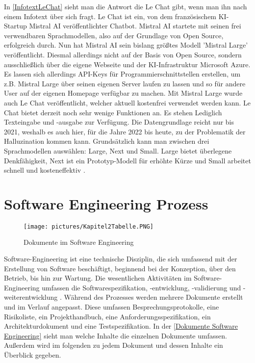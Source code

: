 In \autoref{InfotextLeChat} sieht man die Antwort die Le Chat gibt, wenn man ihn nach einem Infotext über sich 
fragt. Le Chat ist ein, von dem französischem KI-Startup Mistral AI veröffentlichter Chatbot. Mistral AI startete mit  
seinen frei verwendbaren Sprachmodellen, also auf der Grundlage von Open Source, erfolgreich durch. Nun  
hat Mistral AI sein bislang größtes Modell 'Mistral Large' veröffentlicht. Diesmal allerdings nicht auf der  
Basis von Open Source, sondern ausschließlich über die eigene Webseite und der KI-Infrastruktur Microsoft  
Azure. Es lassen sich allerdings API-Keys für Programmierschnittstellen erstellen, um z.B. Mistral Large über  
seinen eigenen Server laufen zu lassen und so für andere User auf der eigenen Homepage verfügbar zu machen.  
Mit Mistral Large wurde auch Le Chat veröffentlicht, welcher aktuell kostenfrei verwendet werden kann.
Le Chat bietet derzeit noch sehr wenige Funktionen an. Es stehen Lediglich Texteingabe und -ausgabe zur Verfügung.  
Die Datengrundlage reicht nur bis 2021, weshalb es auch hier, für die Jahre 2022 bis heute, zu der Problematik der  
Halluzination kommen kann.
Grundsätzlich kann man zwischen drei Sprachmodellen auswählen: Large, Next und Small. Large bietet überlegene Denkfähigkeit,  
Next ist ein Prototyp-Modell für erhöhte Kürze und Small arbeitet schnell und kosteneffektiv \cite{GrundlagenLeChat}.


\section{Software Engineering Prozess}

\begin{figure}
    \centering
    \texttt{[image: pictures/Kapitel2Tabelle.PNG]}
    \caption{Dokumente im Software Engineering}
    \label{Dokumente Software Engineering}
\end{figure}

Software-Engineering ist eine technische Disziplin, die sich umfassend mit der Erstellung von Software beschäftigt, 
beginnend bei der Konzeption, über den Betrieb, bis hin zur Wartung. Die wesentlichen Aktivitäten im Software-Engineering 
umfassen die Softwarespezifikation, -entwicklung, -validierung und -weiterentwicklung \cite{Sommerville10}. Während des Prozesses werden 
mehrere Dokumente erstellt und im Verlauf angepasst. Diese umfassen Besprechungsprotokolle, eine Risikoliste,
ein Projekthandbuch, eine Anforderungsspezifikation, ein Architekturdokument und eine Testspezifikation. In der 
\autoref{Dokumente Software Engineering} sieht man welche Inhalte die einzelnen Dokumente umfassen. Außerdem wird im 
folgenden zu jedem Dokument und dessen Inhalte ein Überblick gegeben.

